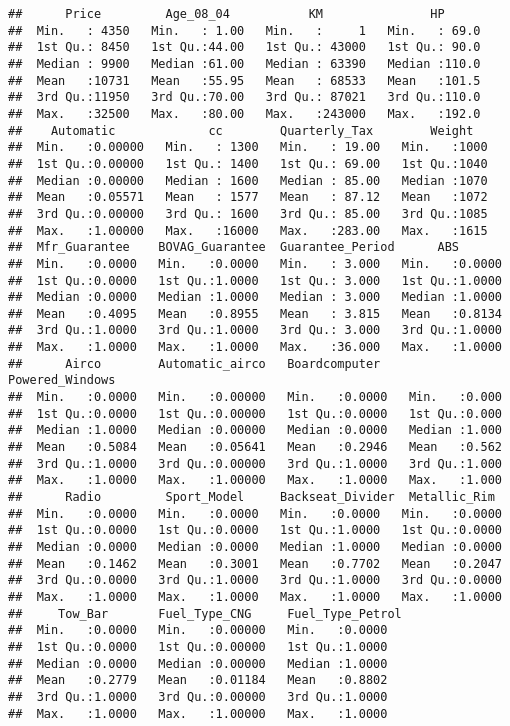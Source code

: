 \documentclass[]{article}
\begin{document}
\begin{verbatim}
##      Price         Age_08_04           KM               HP       
##  Min.   : 4350   Min.   : 1.00   Min.   :     1   Min.   : 69.0  
##  1st Qu.: 8450   1st Qu.:44.00   1st Qu.: 43000   1st Qu.: 90.0  
##  Median : 9900   Median :61.00   Median : 63390   Median :110.0  
##  Mean   :10731   Mean   :55.95   Mean   : 68533   Mean   :101.5  
##  3rd Qu.:11950   3rd Qu.:70.00   3rd Qu.: 87021   3rd Qu.:110.0  
##  Max.   :32500   Max.   :80.00   Max.   :243000   Max.   :192.0  
##    Automatic             cc        Quarterly_Tax        Weight    
##  Min.   :0.00000   Min.   : 1300   Min.   : 19.00   Min.   :1000  
##  1st Qu.:0.00000   1st Qu.: 1400   1st Qu.: 69.00   1st Qu.:1040  
##  Median :0.00000   Median : 1600   Median : 85.00   Median :1070  
##  Mean   :0.05571   Mean   : 1577   Mean   : 87.12   Mean   :1072  
##  3rd Qu.:0.00000   3rd Qu.: 1600   3rd Qu.: 85.00   3rd Qu.:1085  
##  Max.   :1.00000   Max.   :16000   Max.   :283.00   Max.   :1615  
##  Mfr_Guarantee    BOVAG_Guarantee  Guarantee_Period      ABS        
##  Min.   :0.0000   Min.   :0.0000   Min.   : 3.000   Min.   :0.0000  
##  1st Qu.:0.0000   1st Qu.:1.0000   1st Qu.: 3.000   1st Qu.:1.0000  
##  Median :0.0000   Median :1.0000   Median : 3.000   Median :1.0000  
##  Mean   :0.4095   Mean   :0.8955   Mean   : 3.815   Mean   :0.8134  
##  3rd Qu.:1.0000   3rd Qu.:1.0000   3rd Qu.: 3.000   3rd Qu.:1.0000  
##  Max.   :1.0000   Max.   :1.0000   Max.   :36.000   Max.   :1.0000  
##      Airco        Automatic_airco   Boardcomputer    Powered_Windows
##  Min.   :0.0000   Min.   :0.00000   Min.   :0.0000   Min.   :0.000  
##  1st Qu.:0.0000   1st Qu.:0.00000   1st Qu.:0.0000   1st Qu.:0.000  
##  Median :1.0000   Median :0.00000   Median :0.0000   Median :1.000  
##  Mean   :0.5084   Mean   :0.05641   Mean   :0.2946   Mean   :0.562  
##  3rd Qu.:1.0000   3rd Qu.:0.00000   3rd Qu.:1.0000   3rd Qu.:1.000  
##  Max.   :1.0000   Max.   :1.00000   Max.   :1.0000   Max.   :1.000  
##      Radio         Sport_Model     Backseat_Divider  Metallic_Rim   
##  Min.   :0.0000   Min.   :0.0000   Min.   :0.0000   Min.   :0.0000  
##  1st Qu.:0.0000   1st Qu.:0.0000   1st Qu.:1.0000   1st Qu.:0.0000  
##  Median :0.0000   Median :0.0000   Median :1.0000   Median :0.0000  
##  Mean   :0.1462   Mean   :0.3001   Mean   :0.7702   Mean   :0.2047  
##  3rd Qu.:0.0000   3rd Qu.:1.0000   3rd Qu.:1.0000   3rd Qu.:0.0000  
##  Max.   :1.0000   Max.   :1.0000   Max.   :1.0000   Max.   :1.0000  
##     Tow_Bar       Fuel_Type_CNG     Fuel_Type_Petrol
##  Min.   :0.0000   Min.   :0.00000   Min.   :0.0000  
##  1st Qu.:0.0000   1st Qu.:0.00000   1st Qu.:1.0000  
##  Median :0.0000   Median :0.00000   Median :1.0000  
##  Mean   :0.2779   Mean   :0.01184   Mean   :0.8802  
##  3rd Qu.:1.0000   3rd Qu.:0.00000   3rd Qu.:1.0000  
##  Max.   :1.0000   Max.   :1.00000   Max.   :1.0000
\end{verbatim}
\end{document}
